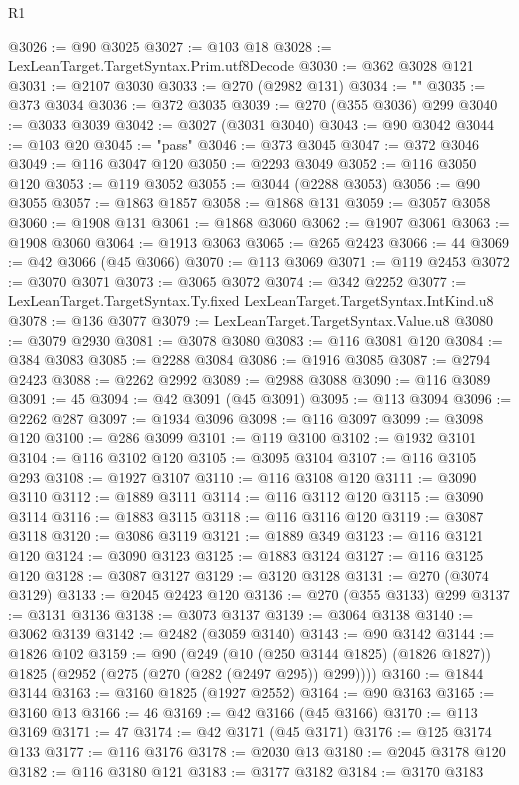 \begin{lexlean}{R1}
\begin{coremodule}
@3026 := @90 @3025
@3027 := @103 @18
@3028 := LexLeanTarget.TargetSyntax.Prim.utf8Decode
@3030 := @362 @3028 @121
@3031 := @2107 @3030
@3033 := @270 (@2982 @131)
@3034 := ""
@3035 := @373 @3034
@3036 := @372 @3035
@3039 := @270 (@355 @3036) @299
@3040 := @3033 @3039
@3042 := @3027 (@3031 @3040)
@3043 := @90 @3042
@3044 := @103 @20
@3045 := "pass"
@3046 := @373 @3045
@3047 := @372 @3046
@3049 := @116 @3047 @120
@3050 := @2293 @3049
@3052 := @116 @3050 @120
@3053 := @119 @3052
@3055 := @3044 (@2288 @3053)
@3056 := @90 @3055
@3057 := @1863 @1857
@3058 := @1868 @131
@3059 := @3057 @3058
@3060 := @1908 @131
@3061 := @1868 @3060
@3062 := @1907 @3061
@3063 := @1908 @3060
@3064 := @1913 @3063
@3065 := @265 @2423
@3066 := 44
@3069 := @42 @3066 (@45 @3066)
@3070 := @113 @3069
@3071 := @119 @2453
@3072 := @3070 @3071
@3073 := @3065 @3072
@3074 := @342 @2252
@3077 := LexLeanTarget.TargetSyntax.Ty.fixed LexLeanTarget.TargetSyntax.IntKind.u8
@3078 := @136 @3077
@3079 := LexLeanTarget.TargetSyntax.Value.u8
@3080 := @3079 @2930
@3081 := @3078 @3080
@3083 := @116 @3081 @120
@3084 := @384 @3083
@3085 := @2288 @3084
@3086 := @1916 @3085
@3087 := @2794 @2423
@3088 := @2262 @2992
@3089 := @2988 @3088
@3090 := @116 @3089
@3091 := 45
@3094 := @42 @3091 (@45 @3091)
@3095 := @113 @3094
@3096 := @2262 @287
@3097 := @1934 @3096
@3098 := @116 @3097
@3099 := @3098 @120
@3100 := @286 @3099
@3101 := @119 @3100
@3102 := @1932 @3101
@3104 := @116 @3102 @120
@3105 := @3095 @3104
@3107 := @116 @3105 @293
@3108 := @1927 @3107
@3110 := @116 @3108 @120
@3111 := @3090 @3110
@3112 := @1889 @3111
@3114 := @116 @3112 @120
@3115 := @3090 @3114
@3116 := @1883 @3115
@3118 := @116 @3116 @120
@3119 := @3087 @3118
@3120 := @3086 @3119
@3121 := @1889 @349
@3123 := @116 @3121 @120
@3124 := @3090 @3123
@3125 := @1883 @3124
@3127 := @116 @3125 @120
@3128 := @3087 @3127
@3129 := @3120 @3128
@3131 := @270 (@3074 @3129)
@3133 := @2045 @2423 @120
@3136 := @270 (@355 @3133) @299
@3137 := @3131 @3136
@3138 := @3073 @3137
@3139 := @3064 @3138
@3140 := @3062 @3139
@3142 := @2482 (@3059 @3140)
@3143 := @90 @3142
@3144 := @1826 @102
@3159 := @90
    (@249
      (@10 (@250 @3144 @1825) (@1826 @1827))
      @1825
      (@2952 (@275 (@270 (@282 (@2497 @295)) @299))))
@3160 := @1844 @3144
@3163 := @3160 @1825 (@1927 @2552)
@3164 := @90 @3163
@3165 := @3160 @13
@3166 := 46
@3169 := @42 @3166 (@45 @3166)
@3170 := @113 @3169
@3171 := 47
@3174 := @42 @3171 (@45 @3171)
@3176 := @125 @3174 @133
@3177 := @116 @3176
@3178 := @2030 @13
@3180 := @2045 @3178 @120
@3182 := @116 @3180 @121
@3183 := @3177 @3182
@3184 := @3170 @3183

\end{coremodule}
\end{lexlean}
